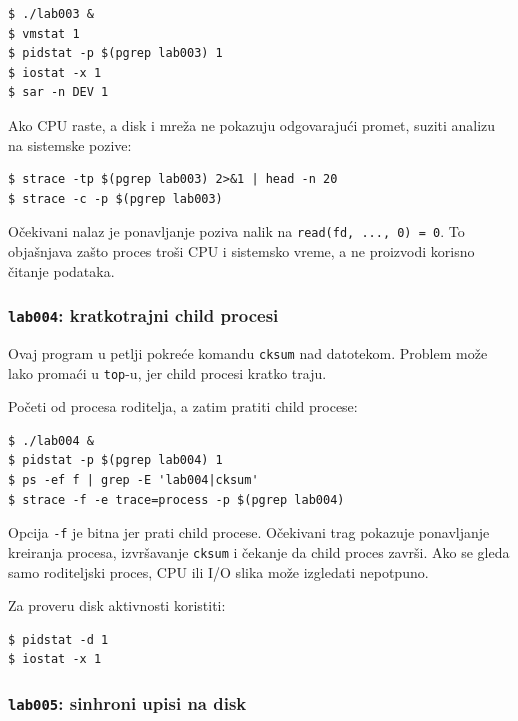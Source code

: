 \begin{verbatim}
$ ./lab003 &
$ vmstat 1
$ pidstat -p $(pgrep lab003) 1
$ iostat -x 1
$ sar -n DEV 1
\end{verbatim}

Ako CPU raste, a disk i mreža ne pokazuju odgovarajući promet, suziti analizu na sistemske pozive:

\begin{verbatim}
$ strace -tp $(pgrep lab003) 2>&1 | head -n 20
$ strace -c -p $(pgrep lab003)
\end{verbatim}

Očekivani nalaz je ponavljanje poziva nalik na \texttt{read(fd, ..., 0) = 0}. To objašnjava zašto proces troši CPU i sistemsko vreme, a ne proizvodi korisno čitanje podataka.

\subsubsection{\texorpdfstring{\texttt{lab004}: kratkotrajni child procesi}{lab004: kratkotrajni child procesi}}\label{lab004-kratkotrajni-procesi}

Ovaj program u petlji pokreće komandu \texttt{cksum} nad datotekom. Problem može lako promaći u \texttt{top}-u, jer child procesi kratko traju.


Početi od procesa roditelja, a zatim pratiti child procese:

\begin{verbatim}
$ ./lab004 &
$ pidstat -p $(pgrep lab004) 1
$ ps -ef f | grep -E 'lab004|cksum'
$ strace -f -e trace=process -p $(pgrep lab004)
\end{verbatim}

Opcija \texttt{-f} je bitna jer prati child procese. Očekivani trag pokazuje ponavljanje kreiranja procesa, izvršavanje \texttt{cksum} i čekanje da child proces završi. Ako se gleda samo roditeljski proces, CPU ili I/O slika može izgledati nepotpuno.

Za proveru disk aktivnosti koristiti:

\begin{verbatim}
$ pidstat -d 1
$ iostat -x 1
\end{verbatim}

\subsubsection{\texorpdfstring{\texttt{lab005}: sinhroni upisi na disk}{lab005: sinhroni upisi na disk}}\label{lab005-sinhroni-upisi}

